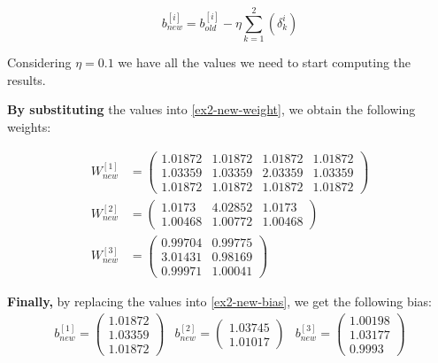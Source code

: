 \documentclass[12pt]{article}
\begin{document}
\begin{enumerate}[leftmargin=\labelsep]
          \begin{equation}\label{ex2-new-bias}
            b^{[i]}_{new} = b^{[i]}_{old} - \eta \sum_{k=1}^{2}\left(\delta_k^{i}\right)
          \end{equation}

          Considering $\eta = 0.1$ we have all the values we need to start computing the results.

          \textbf{By substituting} the values into \eqref{ex2-new-weight}, we obtain the following weights:

          \begin{align*}
            W^{[1]}_{new} &= \begin{pmatrix} 1.01872 & 1.01872 & 1.01872 & 1.01872 \\ 1.03359 & 1.03359 & 2.03359 & 1.03359 \\ 1.01872 & 1.01872 & 1.01872 & 1.01872 \end{pmatrix} \\
            W^{[2]}_{new} &= \begin{pmatrix} 1.0173 & 4.02852 & 1.0173 \\ 1.00468 & 1.00772 & 1.00468\end{pmatrix} \\
            W^{[3]}_{new} &= \begin{pmatrix} 0.99704 & 0.99775 \\ 3.01431 & 0.98169 \\ 0.99971 & 1.00041\end{pmatrix}
          \end{align*}

          \textbf{Finally,} by replacing the values into \eqref{ex2-new-bias}, we get the following bias:
          \[
              \begin{array}{ccc}
                  b^{[1]}_{new} = \begin{pmatrix} 1.01872 \\ 1.03359 \\ 1.01872\end{pmatrix} &
                  b^{[2]}_{new} = \begin{pmatrix} 1.03745 \\ 1.01017\end{pmatrix} &
                  b^{[3]}_{new} = \begin{pmatrix} 1.00198 \\ 1.03177 \\ 0.9993\end{pmatrix}
              \end{array}
          \]
\end{enumerate}
\end{document}
